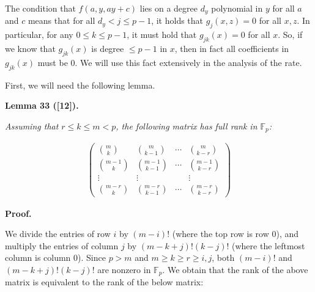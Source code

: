 \documentclass[10pt,a4paper]{article}
\begin{document}
The condition that $f(a,y,ay+c)$ lies on a degree $d_{y}$ polynomial in $y$ for all $a$ and $c$ means that for all $d_{y}<j\leq p-1$, it holds that $g_{j}(x,z)=0$ for all $x,z$. In particular, for any $0\leq k\leq p-1$, it must hold that $g_{jk}(x)=0$ for all $x$. So, if we know that $g_{jk}(x)$ is degree $\leq p-1$ in $x$, then in fact all coefficients in $g_{jk}(x)$ must be $0$. We will use this fact extensively in the analysis of the rate.\par




First, we will need the following lemma.\par





\par\medskip\noindent\textbf{
\textbf{Lemma 33}\textbf{ }([12])\textbf{.}
}\par



\emph{Assuming that $r\leq k\leq m<p$, the following matrix has full rank in $\mathbb{F}_{p}$:}\par


\[\begin{gathered}
\begin{pmatrix}\binom{m}{k}&\binom{m}{k-1}&\cdots&\binom{m}{k-r}\\
\binom{m-1}{k}&\binom{m-1}{k-1}&\cdots&\binom{m-1}{k-r}\\
\vdots&\vdots&&\vdots\\
\binom{m-r}{k}&\binom{m-r}{k-1}&\cdots&\binom{m-r}{k-r}\end{pmatrix}
\end{gathered}\]






\par\medskip\noindent\textbf{Proof.}\par




We divide the entries of row $i$ by $(m-i)!$ (where the top row is row $0$), and multiply the entries of column $j$ by $(m-k+j)!(k-j)!$ (where the leftmost column is column $0$). Since $p>m$ and $m\geq k\geq r\geq i,j$, both $(m-i)!$ and $(m-k+j)!(k-j)!$ are nonzero in $\mathbb{F}_{p}$. We obtain that the rank of the above matrix is equivalent to the rank of the below matrix:\par
\end{document}
